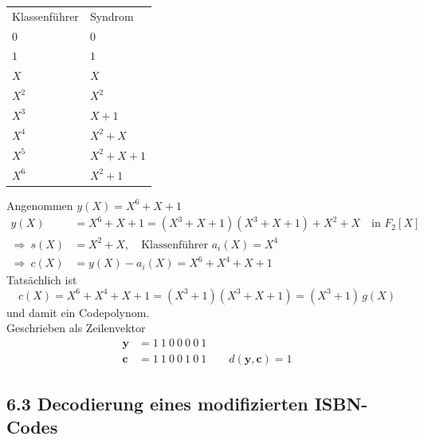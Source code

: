 \begin{beispiel}
\begin{center}
\begin{tabular}{ll}
Klassenführer & Syndrom\\
$0$ & $0$\\
$1$ & $1$\\
$X$ & $X$\\
$X^2$ & $X^2$\\
$X^3$ & $X + 1$\\
$X^4$ & $X^2 + X$\\
$X^5$ & $X^2 + X + 1$\\
$X^6$ & $X^2 + 1$
\end{tabular}
\end{center}

Angenommen $y(X) = X^6 + X + 1$
\begin{align*}
  y(X) &= X^6 + X + 1 = (X^3 + X + 1)(X^3 + X + 1) + X^2 + X \quad \text{in } F_2[X]\\
  \Rightarrow\ s(X) &= X^2 + X, \quad \text{Klassenführer } a_i(X) = X^4
  \\
  \Rightarrow\ c(X) &= y(X) - a_i(X) = X^6 + X^4 + X + 1
\end{align*}
Tatsächlich ist
\[
  c(X) = X^6 + X^4 + X + 1 = (X^3 + 1)(X^3 + X + 1) = (X^3 + 1)\,g(X)
\]
und damit ein Codepolynom.\\
Geschrieben als Zeilenvektor
\begin{align*}
  \mathbf{y} &= 1\ 1\ 0\ 0\ 0\ 0\ 1\\
  \mathbf{c} &= 1\ 1\ 0\ 0\ 1\ 0\ 1 \qquad d(\mathbf{y},\mathbf{c}) = 1
\end{align*}
\end{beispiel}

\subsection{6.3 Decodierung eines modifizierten ISBN-Codes}

